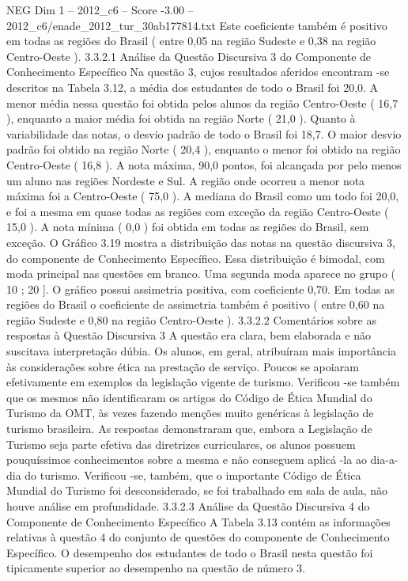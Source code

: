 \begin{textsample}{NEG Dim 1 – 2012\_c6 – Score -3.00 – 2012\_c6/enade\_2012\_tur\_30ab177814.txt}
Este coeficiente também é positivo em todas as regiões do Brasil ( entre 0,05 na região Sudeste e 0,38 na região Centro-Oeste ). 3.3.2.1 Análise da Questão Discursiva 3 do Componente de Conhecimento Específico Na questão 3, cujos resultados aferidos encontram -se descritos na Tabela 3.12, a média dos estudantes de todo o Brasil foi 20,0.
A menor média nessa questão foi obtida pelos alunos da região Centro-Oeste ( 16,7 ), enquanto a maior média foi obtida na região Norte ( 21,0 ).
Quanto à variabilidade das notas, o desvio padrão de todo o Brasil foi 18,7.
O maior desvio padrão foi obtido na região Norte ( 20,4 ), enquanto o menor foi obtido na região Centro-Oeste ( 16,8 ).
A nota máxima, 90,0 pontos, foi alcançada por pelo menos um aluno nas regiões Nordeste e Sul.
A região onde ocorreu a menor nota máxima foi a Centro-Oeste ( 75,0 ).
A mediana do Brasil como um todo foi 20,0, e foi a mesma em quase todas as regiões com exceção da região Centro-Oeste ( 15,0 ).
A nota mínima ( 0,0 ) foi obtida em todas as regiões do Brasil, sem exceção.
O Gráfico 3.19 mostra a distribuição das notas na questão discursiva 3, do componente de Conhecimento Específico.
Essa distribuição é bimodal, com moda principal nas questões em branco.
Uma segunda moda aparece no grupo ( 10 ; 20 ].
O gráfico possui assimetria positiva, com coeficiente 0,70.
Em todas as regiões do Brasil o coeficiente de assimetria também é positivo ( entre 0,60 na região Sudeste e 0,80 na região Centro-Oeste ). 3.3.2.2 Comentários sobre as respostas à Questão Discursiva 3 A questão era clara, bem elaborada e não suscitava interpretação dúbia.
Os alunos, em geral, atribuíram mais importância às considerações sobre ética na prestação de serviço.
Poucos se apoiaram efetivamente em exemplos da legislação vigente de turismo.
Verificou -se também que os mesmos não identificaram os artigos do Código de Ética Mundial do Turismo da OMT, às vezes fazendo menções muito genéricas à legislação de turismo brasileira.
As respostas demonstraram que, embora a Legislação de Turismo seja parte efetiva das diretrizes curriculares, os alunos possuem pouquíssimos conhecimentos sobre a mesma e não conseguem aplicá -la ao dia-a-dia do turismo.
Verificou -se, também, que o importante Código de Ética Mundial do Turismo foi desconsiderado, se foi trabalhado em sala de aula, não houve análise em profundidade. 3.3.2.3 Análise da Questão Discursiva 4 do Componente de Conhecimento Específico A Tabela 3.13 contém as informações relativas à questão 4 do conjunto de questões do componente de Conhecimento Específico.
O desempenho dos estudantes de todo o Brasil nesta questão foi tipicamente superior ao desempenho na questão de número 3.

\end{textsample}
